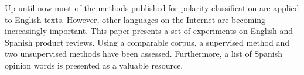 Up until now most of the methods published for polarity classification are applied to English texts. However, other languages on the Internet are becoming
 increasingly important. This paper presents a set of experiments on English and
 Spanish product reviews. Using a comparable corpus, a supervised method and two
 unsupervised methods have been assessed. Furthermore, a list of Spanish opinion
 words is presented as a valuable resource.

